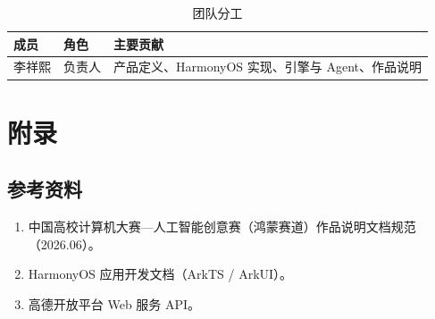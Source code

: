 \documentclass[UTF8,a4paper,zihao=-4]{ctexart}
\begin{document}
\begin{table}[H]
\centering
{}
\begin{tabularx}{\textwidth}{p{2.4cm}p{2.4cm}X}
\toprule
\textbf{成员} & \textbf{角色} & \textbf{主要贡献} \\
\midrule
李祥熙 & 负责人 & 产品定义、HarmonyOS 实现、引擎与 Agent、作品说明 \\
\bottomrule
\end{tabularx}
\caption{团队分工}
\label{tab:team}
\end{table}

\section{附录}

\subsection{参考资料}

\begin{enumerate}
  \item 中国高校计算机大赛—人工智能创意赛（鸿蒙赛道）作品说明文档规范（2026.06）。
  \item HarmonyOS 应用开发文档（ArkTS / ArkUI）。
  \item 高德开放平台 Web 服务 API。
\end{enumerate}
\end{document}

